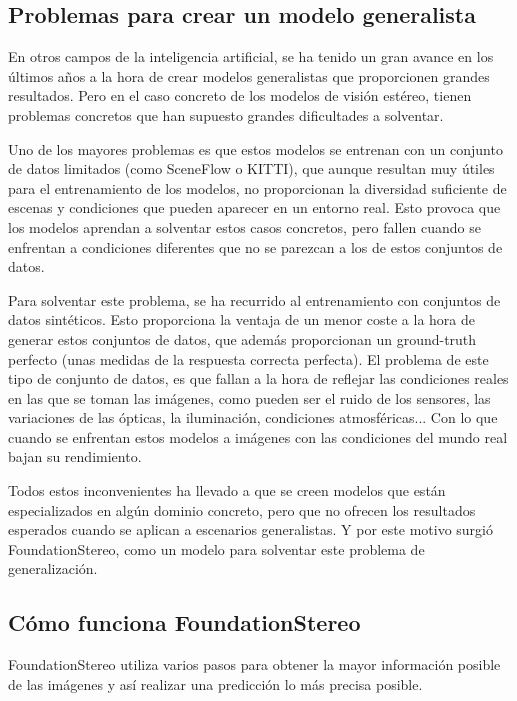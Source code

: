 
\subsection{Problemas para crear un modelo generalista}
En otros campos de la inteligencia artificial, se ha tenido un gran avance en los últimos años a la hora de crear modelos generalistas que proporcionen grandes resultados. Pero en el caso concreto de los modelos de visión estéreo, tienen problemas concretos que han supuesto grandes dificultades a solventar.

Uno de los mayores problemas es que estos modelos se entrenan con un conjunto de datos limitados (como SceneFlow o KITTI), que aunque resultan muy útiles para el entrenamiento de los modelos, no proporcionan la diversidad suficiente de escenas y condiciones que pueden aparecer en un entorno real. Esto provoca que los modelos aprendan a solventar estos casos concretos, pero fallen cuando se enfrentan a condiciones diferentes que no se parezcan a los de estos conjuntos de datos.

Para solventar este problema, se ha recurrido al entrenamiento con conjuntos de datos sintéticos. Esto proporciona la ventaja de un menor coste a la hora de generar estos conjuntos de datos, que además proporcionan un ground-truth perfecto (unas medidas de la respuesta correcta perfecta). El problema de este tipo de conjunto de datos, es que fallan a la hora de reflejar las condiciones reales en las que se toman las imágenes, como pueden ser el ruido de los sensores, las variaciones de las ópticas, la iluminación, condiciones atmosféricas... Con lo que cuando se enfrentan estos modelos a imágenes con las condiciones del mundo real bajan su rendimiento.

Todos estos inconvenientes ha llevado a que se creen modelos que están especializados en algún dominio concreto, pero que no ofrecen los resultados esperados cuando se aplican a escenarios generalistas. Y por este motivo surgió FoundationStereo, como un modelo para solventar este problema de generalización.

\subsection{Cómo funciona FoundationStereo}
FoundationStereo utiliza varios pasos para obtener la mayor información posible de las imágenes y así realizar una predicción lo más precisa posible.

